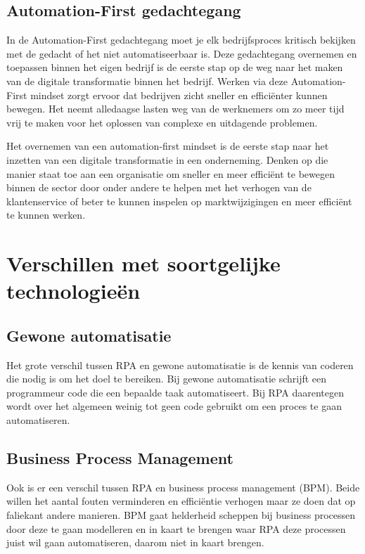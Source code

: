\subsection{Automation-First gedachtegang}
In de Automation-First gedachtegang moet je elk bedrijfsproces kritisch bekijken met de gedacht of het niet automatiseerbaar is. Deze gedachtegang overnemen en toepassen binnen het eigen bedrijf is de eerste stap op de weg naar het maken van de digitale transformatie binnen het bedrijf. Werken via deze Automation-First mindset zorgt ervoor dat bedrijven zicht sneller en efficiënter kunnen bewegen. Het neemt alledaagse lasten weg van de werknemers om zo meer tijd vrij te maken voor het oplossen van complexe en uitdagende problemen.

Het overnemen van een automation-first mindset is de eerste stap naar het inzetten van een digitale transformatie in een onderneming. Denken op die manier staat toe aan een organisatie om sneller en meer efficiënt te bewegen binnen de sector door onder andere te helpen met het verhogen van de klantenservice of beter te kunnen inspelen op marktwijzigingen en meer efficiënt te kunnen werken.

\section{Verschillen met soortgelijke technologieën}

\subsection{Gewone automatisatie}
Het grote verschil tussen RPA en gewone automatisatie is de kennis van coderen die nodig is om het doel te bereiken. Bij gewone automatisatie schrijft een programmeur code die een bepaalde taak automatiseert. Bij RPA daarentegen wordt over het algemeen weinig tot geen code gebruikt om een proces te gaan automatiseren.

\subsection{Business Process Management}
Ook is er een verschil tussen RPA en business process management (BPM). Beide willen het aantal fouten verminderen en efficiëntie verhogen maar ze doen dat op faliekant andere manieren. BPM gaat helderheid scheppen bij business processen door deze te gaan modelleren en in kaart te brengen waar RPA deze processen juist wil gaan automatiseren, daarom niet in kaart brengen.

